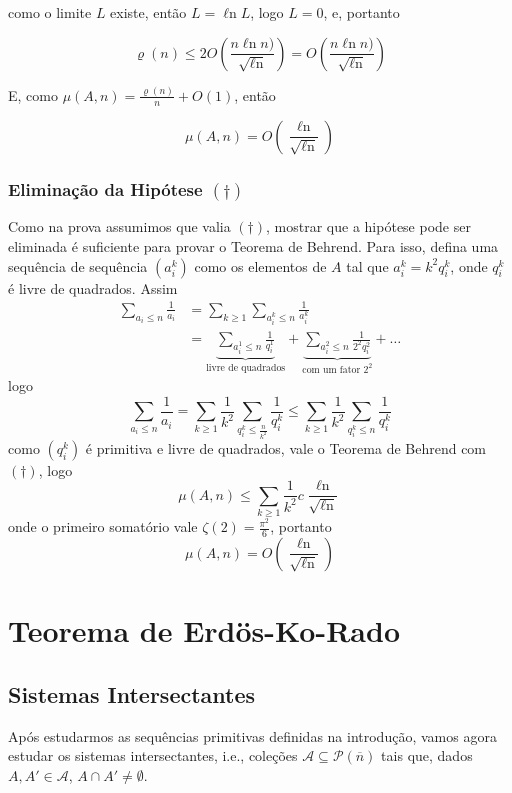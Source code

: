 \documentclass[11pt]{article}
\newcommand{\mc}[1]{\mathcal{#1}}
\newcommand{\ol}[1]{\overline{#1}}
\newcommand{\rp}[1]{{\left(#1\right)}}
\renewcommand{\ln}[1]{{\mathop{\ell n\rp{#1}}}}
\begin{document}
como o limite $L$ existe, então $L=\ln{2}L$, logo $L=0$, e, portanto

$$\varrho(n)\leq 2O\rp{\frac{n\ln(n)}{\sqrt{\ln{\ln{n}}}}}=O\rp{\frac{n\ln(n)}{\sqrt{\ln{\ln{n}}}}}$$

E, como $\mu(A,n)=\frac{\varrho(n)}{n}+O(1)$, então

$$\mu(A,n)=O\rp{\frac{\ln{n}}{\sqrt{\ln{\ln{n}}}}}$$

\subsubsection{Eliminação da Hipótese $(\dagger)$}

Como na prova assumimos que valia $(\dagger)$, mostrar que a hipótese pode ser eliminada é suficiente para provar o Teorema de Behrend. Para isso, defina uma sequência de sequência $(a_i^k)$ como os elementos de $A$ tal que $a_i^k=k^2q_i^k$, onde $q_i^k$ é livre de quadrados.
Assim
\begin{align*}
    \sum_{a_i\leq n}\frac{1}{a_i} & = \sum_{k\geq1}\sum_{a_i^k\leq n}\frac{1}{a_i^k}\\
    & = \underbrace{\sum_{a_i^1\leq n}\frac{1}{q_i^1}}_{\text{livre de quadrados}} + \underbrace{\sum_{a_i^2\leq n}\frac{1}{2^2q_i^2}}_{\text{com um fator }2^2} + \dots
\end{align*}
logo
$$\sum_{a_i\leq n}\frac{1}{a_i}=\sum_{k\geq1}\frac{1}{k^2}\sum_{q_i^k\leq\frac{n}{k^2}}\frac{1}{q_i^k}\leq\sum_{k\geq1}\frac{1}{k^2}\sum_{q_i^k\leq n}\frac{1}{q_i^k}$$
como $(q_i^k)$ é primitiva e livre de quadrados, vale o Teorema de Behrend com $(\dagger)$, logo
$$\mu(A,n) \leq \sum_{k\geq1}\frac{1}{k^2}c\frac{\ln{n}}{\sqrt{\ln{\ln{n}}}}$$
onde o primeiro somatório vale $\zeta(2)=\frac{\pi^2}{6}$, portanto
$$\mu(A,n)=O\rp{\frac{\ln{n}}{\sqrt{\ln{\ln{n}}}}}$$

\section{Teorema de Erdös-Ko-Rado}

\subsection{Sistemas Intersectantes}

Após estudarmos as sequências primitivas definidas na introdução, vamos agora estudar os sistemas intersectantes, i.e., coleções $\mathscr{A}\subseteq\mc{P}(\ol{n})$ tais que, dados $A,A'\in\mathscr{A}$, $A\cap A'\neq\emptyset$.
\end{document}
